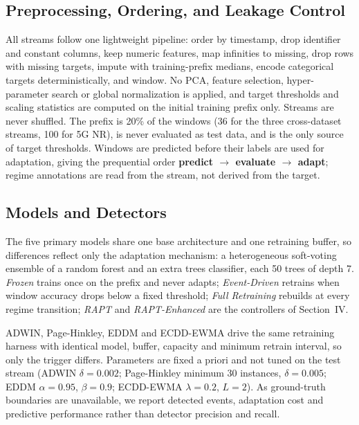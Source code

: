 \documentclass[conference]{IEEEtran}
\begin{document}
\subsection{Preprocessing, Ordering, and Leakage Control}
All streams follow one lightweight pipeline: order by timestamp, drop identifier and
constant columns, keep numeric features, map infinities to missing, drop rows with
missing targets, impute with training-prefix medians, encode categorical targets
deterministically, and window. No PCA, feature selection, hyper-parameter search or
global normalization is applied, and target thresholds and scaling statistics are
computed on the initial training prefix only. Streams are never shuffled. The prefix
is 20\% of the windows (36 for the three cross-dataset streams, 100 for 5G NR), is
never evaluated as test data, and is the only source of target thresholds. Windows
are predicted before their labels are used for adaptation, giving the prequential
order \textbf{predict $\rightarrow$ evaluate $\rightarrow$ adapt}; regime annotations
are read from the stream, not derived from the target.

\subsection{Models and Detectors}
The five primary models share one base architecture and one retraining buffer, so
differences reflect only the adaptation mechanism: a heterogeneous soft-voting
ensemble of a random forest and an extra trees classifier, each 50 trees of depth 7. \emph{Frozen} trains once on the prefix and never
adapts; \emph{Event-Driven} retrains when window accuracy drops below a fixed
threshold; \emph{Full Retraining} rebuilds at every regime transition; \emph{RAPT}
and \emph{RAPT-Enhanced} are the controllers of Section~IV.

ADWIN, Page-Hinkley, EDDM and ECDD-EWMA drive the same retraining harness with
identical model, buffer, capacity and minimum retrain interval, so only the trigger
differs. Parameters are fixed a priori and not tuned on the test stream (ADWIN
$\delta=0.002$; Page-Hinkley minimum 30 instances, $\delta=0.005$; EDDM $\alpha=0.95$,
$\beta=0.9$; ECDD-EWMA $\lambda=0.2$, $L=2$). As ground-truth boundaries are unavailable, we report
detected events, adaptation cost and predictive performance rather than detector
precision and recall.
\end{document}
